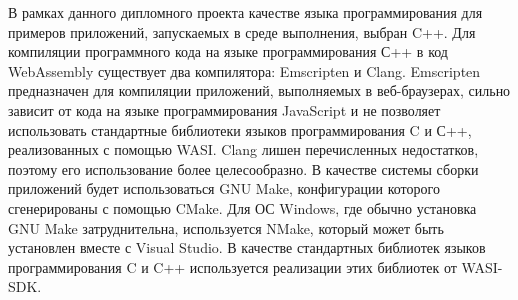 В рамках данного дипломного проекта качестве языка программирования для примеров приложений, запускаемых в среде выполнения, выбран C++.
Для компиляции программного кода на языке программирования С++ в код WebAssembly существует два компилятора: Emscripten и Clang. 
Emscripten предназначен для компиляции приложений, выполняемых в веб-браузерах, сильно зависит от кода на языке программирования JavaScript и не позволяет использовать стандартные библиотеки языков программирования C и С++, реализованных с помощью WASI.
Clang лишен перечисленных недостатков, поэтому его использование более целесообразно.
В качестве системы сборки приложений будет использоваться GNU Make, конфигурации которого сгенерированы с помощью CMake.
Для ОС Windows, где обычно установка GNU Make затруднительна, используется NMake, который может быть установлен вместе с Visual Studio.
В качестве стандартных библиотек языков программирования C и C++ используется реализации этих библиотек от WASI-SDK.

